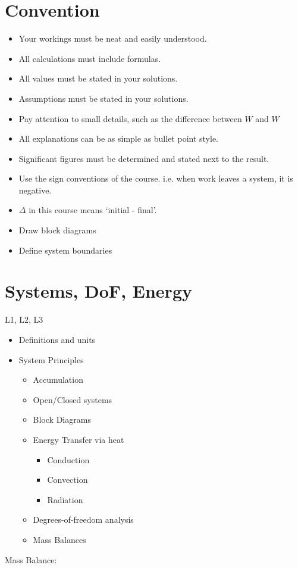 \documentclass[a4paper, 12pt]{article}
\begin{document}
\section*{Convention}
\begin{itemize}
  \item Your workings must be neat and easily understood. 
  \item All calculations must include formulas.
  \item All values must be stated in your solutions.
  \item Assumptions must be stated in your solutions.
  \item Pay attention to small details, such as the difference between $\dot{W}$ and $W$
  \item All explanations can be as simple as bullet point style.
  \item Significant figures must be determined and stated next to the result. 
  \item Use the sign conventions of the course. i.e. when work leaves a system, it is negative.
  \item $\Delta$ in this course means `initial - final'.
  \item Draw block diagrams
  \item Define system boundaries
\end{itemize}
\section*{Systems, DoF, Energy}
L1, L2, L3
\begin{itemize}
  \item Definitions and units 
  \item System Principles
  \begin{itemize}
    \item Accumulation
    \item Open/Closed systems
    \item Block Diagrams
    \item Energy Transfer via heat
    \begin{itemize}
      \item Conduction
      \item Convection 
      \item Radiation 
    \end{itemize}
    \item Degrees-of-freedom analysis
    \item Mass Balances
  \end{itemize}
\end{itemize}
Mass Balance:
\end{document}
